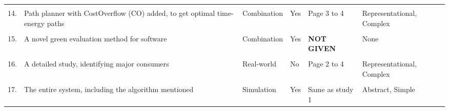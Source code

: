 \begin{table}[h]
\begin{tabular}{p{0.1cm}p{5cm}p{2cm}p{2cm}p{3.5cm}p{3cm}}
            \hline
            \\
            {14.} &
                {Path planner with CostOverflow (CO) added, to get optimal time-energy paths} &
                {Combination} &
                {Yes} &
                {Page 3 to 4} &
                {Representational, Complex} \\
            \hline
            \\
            {15.} &
                {A novel green evaluation method for software} &
                {Combination} &
                {Yes} &
                {\textbf{NOT GIVEN}} &
                {None} \\
            \hline
            \\
            {16.}  &
                {A detailed study, identifying major consumers} &
                {Real-world} &
                {No} &
                {Page 2 to 4} & 
                {Representational, Complex} \\
            \hline
            \\
            {17.}  &
                {The entire system, including the algorithm mentioned} &
                {Simulation} &
                {Yes} &
                {Same as study 1} & 
                {Abstract, Simple} \\
        \bottomrule
    \end{tabular}
    \label{table:data_sheet_part_3}
\end{table}